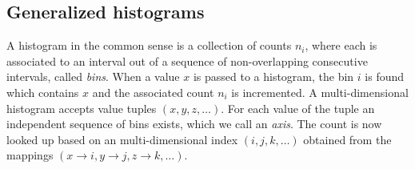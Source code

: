 \documentclass{webofc}
\begin{document}
\subsection{Generalized histograms}
\label{sec-bh-cpp-gen}

A histogram in the common sense is a collection of counts $n_i$, where each is associated to an interval out of a sequence of non-overlapping consecutive intervals, called \emph{bins}. When a value $x$ is passed to a histogram, the bin $i$ is found which contains $x$ and the associated count $n_i$ is incremented. A multi-dimensional histogram accepts value tuples $(x, y, z, \dots)$. For each value of the tuple an independent sequence of bins exists, which we call an \emph{axis}. The count is now looked up based on an multi-dimensional index $(i,j,k,\dots)$ obtained from the mappings $(x \rightarrow i, y \rightarrow j, z \rightarrow k, \dots)$.
\end{document}

